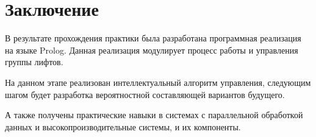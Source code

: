 \newpage
\section{Заключение}
	В результате прохождения практики была разработана программная реализация на языке Prolog.
	Данная реализация модулирует процесс работы и управления группы лифтов.

	На данном этапе реализован интеллектуальный алгоритм управления, следующим шагом будет
	разработка вероятностной составляющей вариантов будущего.

	А также получены практические навыки в системах с параллельной обработкой данных и высокопроизводительные системы, и их компоненты.

